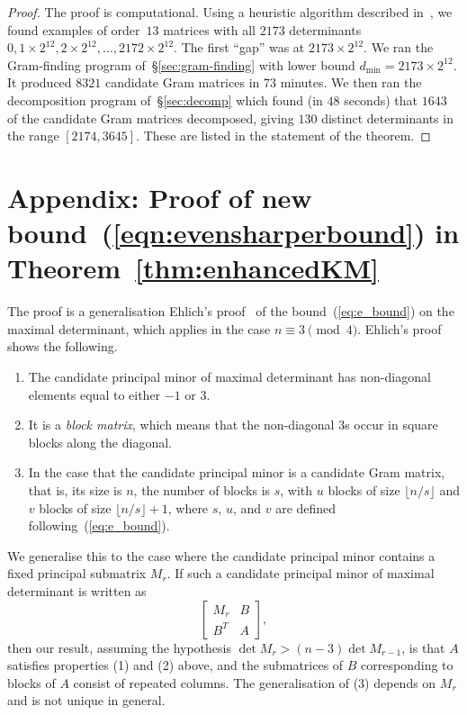 \documentclass[11pt,a4paper]{article}
\begin{document}
\begin{proof}
The proof is computational.  Using a heuristic algorithm
described in~\cite[pg.~34]{Orrick-spectrum-talk}, we found examples of
order~$13$ matrices with all $2173$ determinants 
$0, 1\times 2^{12}, 2 \times 2^{12}, \ldots, 2172\times 2^{12}$.
The first ``gap'' was at $2173\times 2^{12}$.  
We ran the Gram-finding program
of~\S\ref{sec:gram-finding} with lower bound $d_{\min} = 2173\times 2^{12}$.
It produced $8321$ candidate Gram matrices in $73$ minutes.
We then ran the decomposition program of~\S\ref{sec:decomp} which found 
(in $48$ seconds) that $1643$ %
of the candidate Gram matrices decomposed, 
giving $130$ distinct determinants in the range $[2174,3645]$.
These are listed in the statement of the theorem.
\end{proof}

\appendix
\section*{Appendix: Proof of new bound~(\ref{eqn:evensharperbound}) in
Theorem~\ref{thm:enhancedKM}}
The proof is a generalisation Ehlich's proof~\cite{Ehlich64a} of the
bound~(\ref{eq:e_bound}) on the maximal determinant, which applies in the
case $n\equiv3\pmod{4}$.  Ehlich's proof shows the following.
\begin{enumerate}
\item[(1)] The candidate principal minor of maximal determinant has 
non-diagonal elements equal to either $-1$ or $3$.
\item[(2)] It is a {\em block matrix}, which means that the 
non-diagonal 3s occur in square blocks along the diagonal. 
\item[(3)] In the case that the candidate principal minor is a 
candidate Gram matrix, that is, its size is $n$, the number of blocks is $s$, 
with $u$ blocks of size $\lfloor n/s\rfloor$ and $v$ blocks of 
size $\lfloor n/s\rfloor+1$, where $s$, $u$, and $v$ are defined 
following~(\ref{eq:e_bound}).
\end{enumerate}
We generalise this to the case where the candidate principal minor contains 
a fixed principal submatrix $M_r$.  If such a candidate principal minor of 
maximal determinant is written as
\begin{equation*}
\begin{bmatrix}M_r & B\\B^T & A\end{bmatrix},
\end{equation*}
then our result, assuming the hypothesis $\det M_r>(n-3)\det M_{r-1}$, 
is that $A$ satisfies properties (1) and (2) above, and the submatrices 
of $B$ corresponding to blocks of $A$ consist of repeated columns.  
The generalisation of (3) depends on $M_r$ and is not unique in general.
\end{document}
